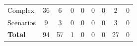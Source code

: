 \begin{table}[h]
{\begin{tabular}{l|cc|cc|cc|cc}
      Complex                            & 36                       & 6                        & 0                         & 0                          & 0 & 0   & 2 & 0   \\
      Scenarios                          & 9                       & 3                        & 0                         & 0                          & 0 & 0   & 3 & 0   \\
      \midrule
      \textbf{Total}                     & 94                       & 57                        & 1                         & 0                          & 0 & 0   & 27 & 0   \\
      \bottomrule
    \end{tabular}%
  }
\end{table}

